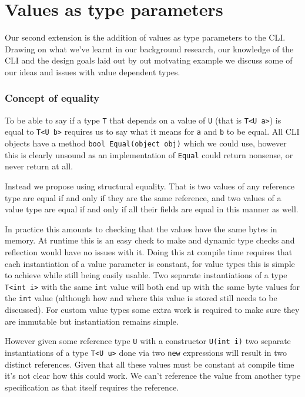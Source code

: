 \chapter{Values as type parameters}

Our second extension is the addition of values as type parameters to the CLI.
Drawing on what we've learnt in our background research, our knowledge of the 
CLI and the design goals laid out by out motvating example we discuss some of
our ideas and issues with value dependent types.

\subsection{Concept of equality}

To be able to say if a type \texttt{T} that depends on a value of
\texttt{U} (that is \texttt{T<U a>}) is equal to \texttt{T<U b>} requires
us to say what it means for \texttt{a} and \texttt{b} to be equal.
All CLI objects have a method \texttt{bool Equal(object obj)} which
we could use, however this is clearly unsound as an implementation
of \texttt{Equal} could return nonsense, or never return at all.

Instead we propose using structural equality. That is
two values of any reference type are equal if and only if they are
the same reference, and two values of a value type are equal if and
only if all their fields are equal in this manner as well. 

In practice this amounts to checking that the values have the same bytes in memory.
At runtime this is an easy check to make and dynamic type checks and reflection would have
no issues with it. Doing this at compile time requires that each instantiation of a value 
parameter is constant, for value types this is simple to achieve while still being easily usable.
Two separate instantiations of a type \texttt{T<int i>} with the same \texttt{int} value will both end 
up with the same byte values for the \texttt{int} value (although how and where this value is stored 
still needs to be discussed). For custom value types some extra work is required to make sure they are
immutable but instantiation remains simple. 

However given some reference type \texttt{U} with a constructor \texttt{U(int i)} two separate instantiations of 
a type \texttt{T<U u>} done via two \texttt{new} expressions will result in two distinct references. 
Given that all these values must be constant at compile time it's not clear how this could work. We can't 
reference the value from another type specification as that itself requires the reference.

